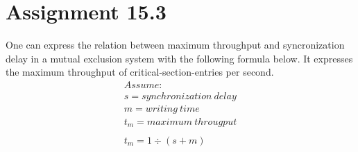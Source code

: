 \section{Assignment 15.3}
One can express the relation between maximum throughput and syncronization delay in a mutual exclusion system with the following formula below. It expresses the maximum throughput of critical-section-entries per second.
\begin{align} \label{equationMaxThrouput}
	Assume:\\
	s = synchronization\ delay\\
	m = writing\ time\\
	t_m = maximum\ througput\\\\
	t_m=1\div(s+m)
\end{align}
